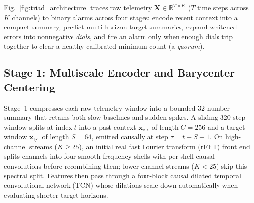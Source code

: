 \documentclass[journal]{IEEEtran}
\begin{document}
Fig.~\ref{fig:triad_architecture} traces raw telemetry $\mathbf{X} \in \mathbb{R}^{T \times K}$ ($T$ time steps across $K$ channels) to binary alarms across four stages: encode recent context into a compact summary, predict multi-horizon target summaries, expand whitened errors into nonnegative \emph{dials}, and fire an alarm only when enough dials trip together to clear a healthy-calibrated minimum count (a \emph{quorum}).

\subsection{Stage 1: Multiscale Encoder and Barycenter Centering}
\label{subsec:architecture}
\label{subsec:shared_inductive_biases}
Stage~1 compresses each raw telemetry window into a bounded $32$-number summary that retains both slow baselines and sudden spikes. A sliding $320$-step window splits at index $t$ into a past context $\mathbf{x}_{\text{ctx}}$ of length $C=256$ and a target window $\mathbf{x}_{\text{tgt}}$ of length $S=64$, emitted causally at step $\tau = t + S - 1$. On high-channel streams ($K \ge 25$), an initial real fast Fourier transform (rFFT) front end splits channels into four smooth frequency shells with per-shell causal convolutions before recombining them; lower-channel streams ($K < 25$) skip this spectral split. Features then pass through a four-block causal dilated temporal convolutional network (TCN) \cite{bai2018empirical} whose dilations scale down automatically when evaluating shorter target horizons.
\end{document}
